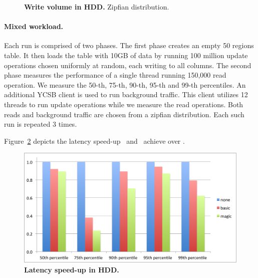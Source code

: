 {\begin{figure}[htb]
\caption{{\bf  Write volume in HDD.} Zipfian distribution.
}
\label{fig:volume-hdd-uniform}
\end{figure}



\paragraph{Mixed workload.}
Each run is comprised of two phases. 
The first phase creates an empty 50 regions table. It then loads the table with 10GB of data by running 100 million update operations chosen uniformly at random, each writing to all columns. 
The second phase measures the performance of a single thread running 150,000 read operation. 
We measure the 50-th, 75-th, 90-th, 95-th and 99-th percentiles.
An additional YCSB client is used to run background traffic. 
This client utilizes 12 threads to run update operations while we measure the read operations. 
Both reads and background traffic are chosen from a zipfian distribution.
Each such run is repeated 3 times. 

Figure~\ref{fig:latency-speedup-hdd} depicts the latency speed-up \basic\ and \magic\ achieve over \none.

\begin{figure}[htb]
\includegraphics[width=\figw]{Figs/latency-speedup-hdd.png}
\caption{{\bf Latency speed-up in HDD.} 
}
\label{fig:latency-speedup-hdd}
\end{figure}
}

